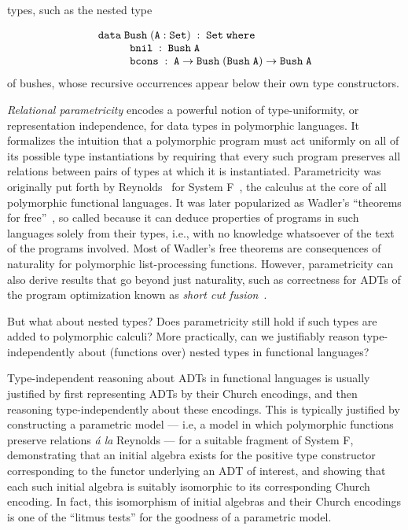\documentclass{lmcs}
\theoremstyle{plain}\newtheorem{satz}[thm]{Satz}
\begin{document}
types, such as the nested type {\small
\[\begin{array}{l}
\mathtt{data\; Bush\;(A : Set)\;:\;Set\;where}\\
\hspace*{0.4in}\mathtt{bnil\;:\; Bush\;A}\\
\hspace*{0.4in}\mathtt{bcons\;:\;A \rightarrow Bush\;(Bush \; A)
  \rightarrow Bush\;A} 
\end{array}\]
\hspace{-0.04in}of bushes, whose recursive occurrences appear below
their own type constructors.

{\em Relational parametricity} encodes a powerful notion of
type-uniformity, or representation independence, for data types in
polymorphic languages. It formalizes the intuition that a polymorphic
program must act uniformly on all of its possible type instantiations
by requiring that every such program preserves all relations between
pairs of types at which it is instantiated. Parametricity was
originally put forth by Reynolds~\cite{rey83} for System
F~\cite{gir72}, the calculus at the core of all polymorphic functional
languages. It was later popularized as Wadler's ``theorems for
free''~\cite{wad89}, so called because it can deduce properties of
programs in such languages solely from their types, i.e., with no
knowledge whatsoever of the text of the programs involved.  Most of
Wadler's free theorems are consequences of naturality for polymorphic
list-processing functions. However, parametricity can also derive
results that go beyond just naturality, such as correctness for ADTs
of the program optimization known as {\em short cut
  fusion}~\cite{glp93,joh02}.

But what about nested types? Does parametricity still hold if such
types are added to polymorphic calculi? More practically, can we
justifiably reason type-independently about (functions over) nested
types in functional languages?

Type-independent reasoning about ADTs in functional languages is
usually justified by first representing ADTs by their Church
encodings, and then reasoning type-independently about these
encodings. This is typically justified by constructing a parametric
model --- i.e, a model in which polymorphic functions preserve
relations {\em \'a la} Reynolds --- for a suitable fragment of System
F, demonstrating that an initial algebra exists for the positive type
constructor corresponding to the functor underlying an ADT of
interest, and showing that each such initial algebra is suitably
isomorphic to its corresponding Church encoding. In fact, this
isomorphism of initial algebras and their Church encodings is one of
the ``litmus tests'' for the goodness of a parametric model.

}
\end{document}
